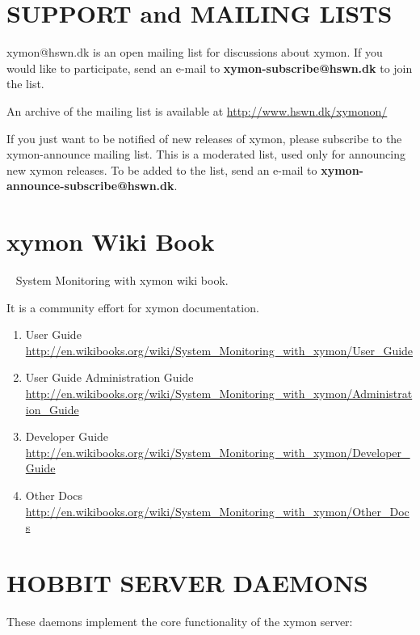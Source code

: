 \section{SUPPORT and MAILING LISTS}
xymon@hswn.dk is an open mailing list for discussions about
xymon. If you would like to participate, send an e-mail to
\textbf{xymon-subscribe@hswn.dk} to join the list. 


An archive of the mailing list is available at \url{http://www.hswn.dk/xymonon/}


If you just want to be notified of new releases of xymon, please
subscribe to the xymon-announce mailing list. This is a moderated
list, used only for announcing new xymon releases. To be added to
the list, send an e-mail to \textbf{xymon-announce-subscribe@hswn.dk}. 

\section{xymon Wiki Book}

~\cite{wikibook:wikibooktjyang} System Monitoring with xymon wiki book.

It is a community effort for xymon documentation.

\begin{enumerate}

\item User Guide  \url{http://en.wikibooks.org/wiki/System_Monitoring_with_xymon/User_Guide}

\item User Guide Administration Guide
  \url{http://en.wikibooks.org/wiki/System_Monitoring_with_xymon/Administration_Guide}

\item Developer Guide \url{http://en.wikibooks.org/wiki/System_Monitoring_with_xymon/Developer_Guide}

\item Other Docs
\url{http://en.wikibooks.org/wiki/System_Monitoring_with_xymon/Other_Docs}

\end{enumerate}

\section{HOBBIT SERVER DAEMONS}
 These daemons implement the core functionality of the xymon server: 

